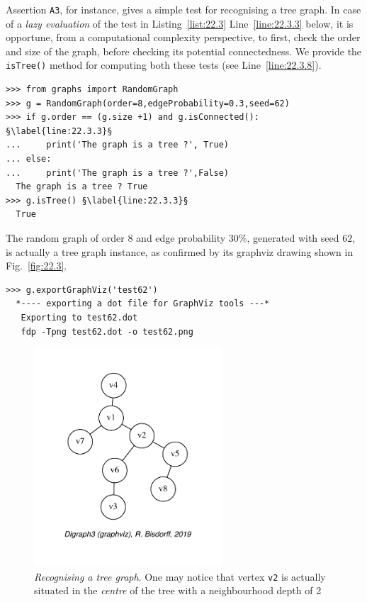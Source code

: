 Assertion \texttt{A3}, for instance, gives a simple test for recognising a tree graph. In case of a \emph{lazy evaluation} of the test in Listing~\vref{list:22.3} Line~\ref{line:22.3.3} below, it is opportune, from a computational complexity perspective, to first, check the order and size of the graph, before checking its potential connectedness. We provide the \texttt{isTree()} method for computing both these tests (see Line~\ref{line:22.3.8}).
\begin{lstlisting}[caption={Recognizing a tree graph.},label=list:22.3]
>>> from graphs import RandomGraph
>>> g = RandomGraph(order=8,edgeProbability=0.3,seed=62)
>>> if g.order == (g.size +1) and g.isConnected(): §\label{line:22.3.3}§
...     print('The graph is a tree ?', True)
... else:
...     print('The graph is a tree ?',False)   
  The graph is a tree ? True
>>> g.isTree() §\label{line:22.3.3}§
  True  
\end{lstlisting}
The random graph of order $8$ and edge probability $30\%$, generated with seed $62$, is actually a tree graph instance, as confirmed by its graphviz drawing shown in Fig.~\vref{fig:22.3}.
\begin{lstlisting}
>>> g.exportGraphViz('test62')
  *---- exporting a dot file for GraphViz tools ---*
   Exporting to test62.dot
   fdp -Tpng test62.dot -o test62.png
\end{lstlisting}
\begin{figure}[ht]
\sidecaption[t]
\includegraphics[width=7cm]{Figures/22-3-test62.pdf}
\caption[Recognising a tree graph]{\emph{Recognising a tree graph}. One may notice that vertex \texttt{v2} is actually situated in the \emph{centre} of the tree with a neighbourhood depth of 2} 
\label{fig:22.3}       %
\end{figure}

